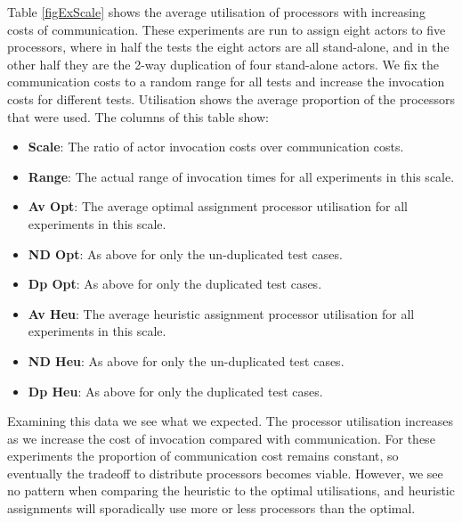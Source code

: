 Table \ref{figExScale} shows the average utilisation of processors with increasing costs of communication.
These experiments are run to assign eight actors to five processors, where in half the tests the eight actors are all stand-alone, and in the other half they are the 2-way duplication of four stand-alone actors.
We fix the communication costs to a random range for all tests and increase the invocation costs for different tests.
Utilisation shows the average proportion of the processors that were used.
The columns of this table show:
\begin{itemize}
	\item {\bf Scale}: The ratio of actor invocation costs over communication costs.
	\item {\bf Range}: The actual range of invocation times for all experiments in this scale.
	\item {\bf Av Opt}: The average optimal assignment processor utilisation for all experiments in this scale.
	\item {\bf ND Opt}: As above for only the un-duplicated test cases.
	\item {\bf Dp Opt}: As above for only the duplicated test cases.
	\item {\bf Av Heu}: The average heuristic assignment processor utilisation for all experiments in this scale.
	\item {\bf ND Heu}: As above for only the un-duplicated test cases.
	\item {\bf Dp Heu}: As above for only the duplicated test cases.
\end{itemize}

Examining this data we see what we expected.
The processor utilisation increases as we increase the cost of invocation compared with communication.
For these experiments the proportion of communication cost remains constant, so eventually the tradeoff to distribute processors becomes viable.
However, we see no pattern when comparing the heuristic to the optimal utilisations, and heuristic assignments will sporadically use more or less processors than the optimal.

